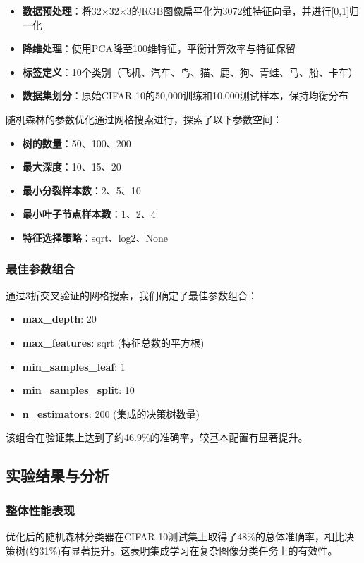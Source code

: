 \documentclass[UTF8]{report}
\theoremstyle{MyLineTheoremStyle} %
\theoremstyle{MyBlockTheoremStyle} %
\theoremstyle{MySubsubsectionStyle} %
\begin{document}
\begin{itemize}
    \item \textbf{数据预处理}：将32×32×3的RGB图像扁平化为3072维特征向量，并进行[0,1]归一化
    \item \textbf{降维处理}：使用PCA降至100维特征，平衡计算效率与特征保留
    \item \textbf{标签定义}：10个类别（飞机、汽车、鸟、猫、鹿、狗、青蛙、马、船、卡车）
    \item \textbf{数据集划分}：原始CIFAR-10的50,000训练和10,000测试样本，保持均衡分布
\end{itemize}

随机森林的参数优化通过网格搜索进行，探索了以下参数空间：
\begin{itemize}
    \item \textbf{树的数量}：50、100、200
    \item \textbf{最大深度}：10、15、20
    \item \textbf{最小分裂样本数}：2、5、10
    \item \textbf{最小叶子节点样本数}：1、2、4
    \item \textbf{特征选择策略}：sqrt、log2、None
\end{itemize}

\subsubsection{最佳参数组合}
通过3折交叉验证的网格搜索，我们确定了最佳参数组合：
\begin{itemize}
    \item \textbf{max\_depth}: 20
    \item \textbf{max\_features}: sqrt (特征总数的平方根)
    \item \textbf{min\_samples\_leaf}: 1
    \item \textbf{min\_samples\_split}: 10
    \item \textbf{n\_estimators}: 200 (集成的决策树数量)
\end{itemize}

该组合在验证集上达到了约46.9\%的准确率，较基本配置有显著提升。

\subsection{实验结果与分析}

\subsubsection{整体性能表现}
优化后的随机森林分类器在CIFAR-10测试集上取得了48\%的总体准确率，相比决策树(约31\%)有显著提升。这表明集成学习在复杂图像分类任务上的有效性。
\end{document}

